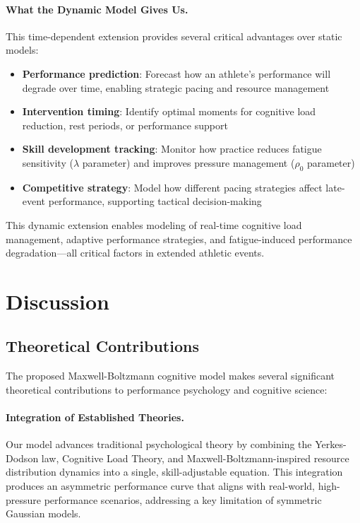 \documentclass{article}
\begin{document}
\paragraph{What the Dynamic Model Gives Us.} This time-dependent extension provides several critical advantages 
over static models:

\begin{itemize}
    \item \textbf{Performance prediction}: Forecast how an athlete's performance will degrade over time, enabling 
    strategic pacing and resource management
    
    \item \textbf{Intervention timing}: Identify optimal moments for cognitive load reduction, rest periods, or 
    performance support
    
    \item \textbf{Skill development tracking}: Monitor how practice reduces fatigue sensitivity ($\lambda$ parameter) 
    and improves pressure management ($\rho_0$ parameter)
    
    \item \textbf{Competitive strategy}: Model how different pacing strategies affect late-event performance, 
    supporting tactical decision-making
\end{itemize}

This dynamic extension enables modeling of real-time cognitive load management, adaptive performance strategies, 
and fatigue-induced performance degradation—all critical factors in extended athletic events.

\section*{Discussion}

\subsection*{Theoretical Contributions}

The proposed Maxwell-Boltzmann cognitive model makes several significant theoretical contributions to performance 
psychology and cognitive science:

\paragraph{Integration of Established Theories.} Our model advances traditional psychological theory by combining 
the Yerkes-Dodson law, Cognitive Load Theory, and Maxwell-Boltzmann-inspired resource distribution dynamics into 
a single, skill-adjustable equation. This integration produces an asymmetric performance curve that aligns with 
real-world, high-pressure performance scenarios, addressing a key limitation of symmetric Gaussian models.
\end{document}
